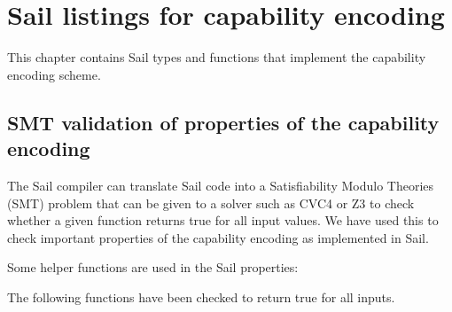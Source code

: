
\chapter{Sail listings for capability encoding}
\label{chap:sailenc}

This chapter contains Sail types and functions that implement the
capability encoding scheme.

\medskip
{}

\medskip
{}

\medskip
\label{sailRISCVzencCapabilityToCapability}
\sailRISCVfnencCapabilityToCapability

\medskip
\sailRISCVfncapToEncCap

\medskip
\sailRISCVfngetCapBoundsBits

\medskip
\sailRISCVfnsetCapBounds

\medskip
\sailRISCVfngetRepresentableAlignmentMask

\medskip
\sailRISCVfngetRepresentableLength

\section{SMT validation of properties of the capability encoding}

The Sail compiler can translate Sail code into a Satisfiability Modulo Theories
(SMT) problem that can be given to a solver such as CVC4 or Z3 to check whether
a given function returns true for all input values. We have used this to
check important properties of the capability encoding as implemented in Sail.

Some helper functions are used in the Sail properties:

\medskip
{}

\medskip
{}

The following functions have been checked to return true for all inputs.

\medskip
{}

\medskip
{}

\medskip
{}

\medskip
{}

\medskip
{}

\medskip
{}

\medskip
{}

\medskip
{}
